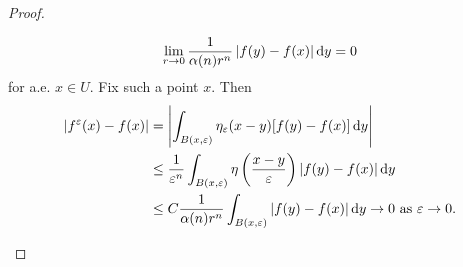 \begin{proof}
\begin{enumerate}
    \[
      \lim\limits_{r \to 0} \frac{1}{\alpha(n)r^n} \left\lvert f(y) - f(x) \right\rvert \mathop{}\!\mathrm{d} y = 0
    \]
    for a.e. \( x \in U \).
    Fix such a point \( x \).
    Then
    \begin{align*}
      \left\lvert f^{\varepsilon}(x) - f(x) \right\rvert &= \left\lvert \int_{B(x, \varepsilon)} \eta_{\varepsilon}(x - y)[f(y) - f(x)] \dif y \right\rvert\\
                                                         &\leq \frac{1}{\varepsilon^n}\int_{B(x, \varepsilon)} \eta \left( \frac{x - y}{\varepsilon} \right) \left\lvert f(y) - f(x) \right\rvert \dif y\\
                                                         &\leq C \frac{1}{\alpha(n)r^n} \int_{B(x, \varepsilon)} \left\lvert f(y) - f(x) \right\rvert \dif y \to 0 \text{ as } \varepsilon \to 0. %
    \end{align*}
\end{enumerate}
\end{proof}


